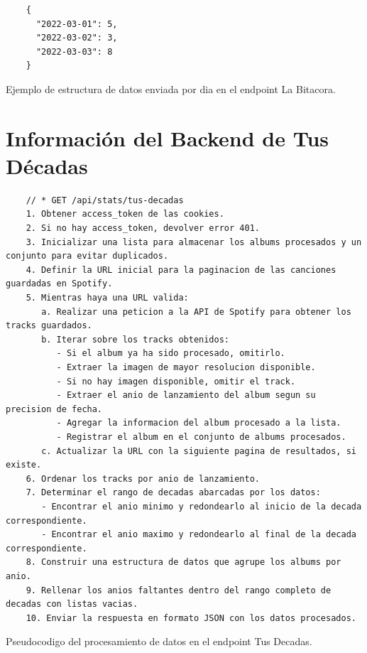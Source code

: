 \begin{ifalgorithm}[H]
    \begin{lstlisting}
    {
      "2022-03-01": 5,
      "2022-03-02": 3,
      "2022-03-03": 8
    }
    \end{lstlisting}
    \caption{Ejemplo de estructura de datos enviada por dia en el endpoint La Bitacora.}
    \label{alg:la_bitacora_response_day}
\end{ifalgorithm}

\section{Información del Backend de Tus Décadas} \label{sec:backend_tus_decadas}

\begin{ifalgorithm}[H]
    \begin{lstlisting}
    // * GET /api/stats/tus-decadas
    1. Obtener access_token de las cookies.
    2. Si no hay access_token, devolver error 401.
    3. Inicializar una lista para almacenar los albums procesados y un conjunto para evitar duplicados.
    4. Definir la URL inicial para la paginacion de las canciones guardadas en Spotify.
    5. Mientras haya una URL valida:
       a. Realizar una peticion a la API de Spotify para obtener los tracks guardados.
       b. Iterar sobre los tracks obtenidos:
          - Si el album ya ha sido procesado, omitirlo.
          - Extraer la imagen de mayor resolucion disponible.
          - Si no hay imagen disponible, omitir el track.
          - Extraer el anio de lanzamiento del album segun su precision de fecha.
          - Agregar la informacion del album procesado a la lista.
          - Registrar el album en el conjunto de albums procesados.
       c. Actualizar la URL con la siguiente pagina de resultados, si existe.
    6. Ordenar los tracks por anio de lanzamiento.
    7. Determinar el rango de decadas abarcadas por los datos:
       - Encontrar el anio minimo y redondearlo al inicio de la decada correspondiente.
       - Encontrar el anio maximo y redondearlo al final de la decada correspondiente.
    8. Construir una estructura de datos que agrupe los albums por anio.
    9. Rellenar los anios faltantes dentro del rango completo de decadas con listas vacias.
    10. Enviar la respuesta en formato JSON con los datos procesados.
    \end{lstlisting}
    \caption{Pseudocodigo del procesamiento de datos en el endpoint Tus Decadas.}
    \label{alg:tus_decadas}
\end{ifalgorithm}

